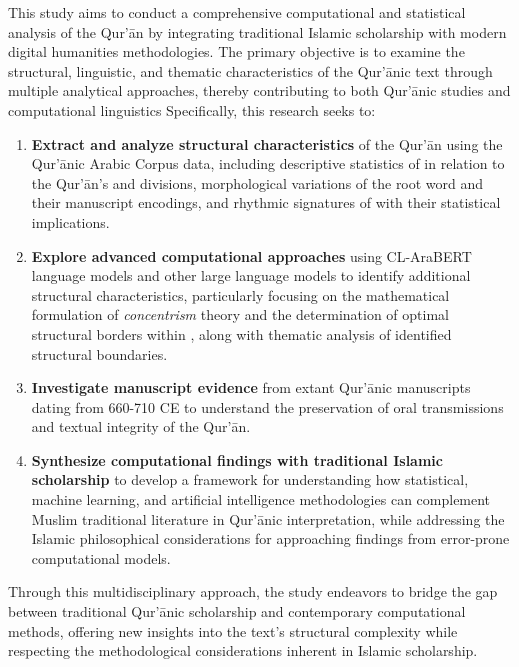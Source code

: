 This study aims to conduct a comprehensive computational and statistical analysis of the Qur'\=an by integrating traditional Islamic scholarship with modern digital humanities methodologies. The primary objective is to examine the structural, linguistic, and thematic characteristics of the Qur'\=anic text through multiple analytical approaches, thereby contributing to both Qur'\=anic studies and computational linguistics Specifically, this research seeks to:
\begin{enumerate}
    \item \textbf{Extract and analyze structural characteristics} of the Qur'\=an using the Qur'\=anic Arabic Corpus data, including descriptive statistics of   in relation to the Qur'\=an's   and   divisions, morphological variations of the root word   and their manuscript encodings, and rhythmic signatures of   with their statistical implications.

    \item \textbf{Explore advanced computational approaches} using CL-AraBERT language models and other large language models to identify additional structural characteristics, particularly focusing on the mathematical formulation of \textit{concentrism} theory and the determination of optimal structural borders within  , along with thematic analysis of identified structural boundaries.
    
    \item \textbf{Investigate manuscript evidence} from extant Qur'\=anic manuscripts dating from 660-710 CE to understand the preservation of oral transmissions and textual integrity of the Qur'\=an.
    
    \item \textbf{Synthesize computational findings with traditional Islamic scholarship} to develop a framework for understanding how statistical, machine learning, and artificial intelligence methodologies can complement Muslim traditional literature in Qur'\=anic interpretation, while addressing the Islamic philosophical considerations for approaching findings from error-prone computational models.
\end{enumerate}

Through this multidisciplinary approach, the study endeavors to bridge the gap between traditional Qur'\=anic scholarship and contemporary computational methods, offering new insights into the text's structural complexity while respecting the methodological considerations inherent in Islamic scholarship.
